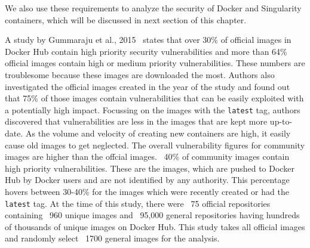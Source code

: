 We also use these requirements to analyze the security of Docker
and Singularity containers, which will be discussed in next section of
this chapter.

A study by Gummaraju et al., 2015~\cite{gummaraju2015over}
states that over 30\% of official images in Docker Hub contain high priority
security vulnerabilities and more than 64\% official
images contain high or medium priority vulnerabilities. These numbers are
troublesome because these images
are downloaded the most. Authors also investigated the official images created
in the year of the study and found out that 75\% of those images
contain vulnerabilities that can be easily exploited with a potentially
high impact. Focussing on the images with the \texttt{latest} tag, authors
discovered that vulnerabilities are less in the images that are kept
more up-to-date. As the volume and velocity of creating new containers
are high, it easily cause old images to get neglected.
The overall vulnerability figures for community images are higher than the
offcial images.
~40\% of community images contain high priority vulnerabilities. These 
are the images, which are pushed to Docker Hub by Docker users 
and are not identified by any authority.
This percentage hovers between 30-40\% for the images which were recently
created or had the \texttt{latest} tag.
At the time of this study, there were ~75 official repositories containing 
~960 unique images and ~95,000 general repositories having hundreds of thousands 
of unique images on Docker Hub.
This study takes all official images and randomly select ~1700 general images for the analysis.

